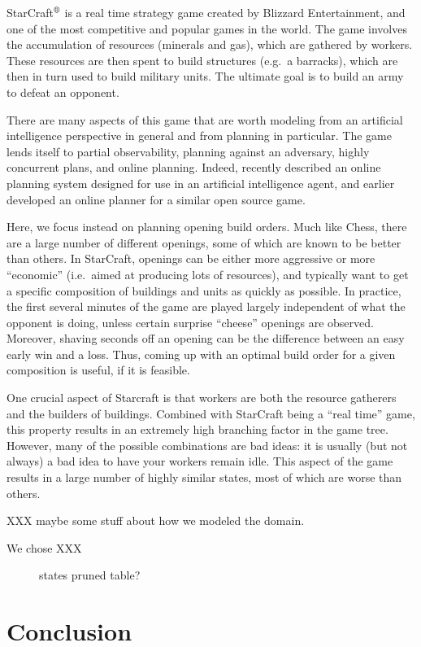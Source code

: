\documentclass[letterpaper]{article}
\theoremstyle{plain} \newtheorem{theorem}{Theorem} \newtheorem{proposition}{Proposition} \newtheorem{lemma}{Lemma}
\theoremstyle{definition} \newtheorem{definition}{Definition} \newtheorem{conjecture}{Conjecture} \newtheorem*{example}{Example}
\theoremstyle{remark} \newtheorem*{remark}{Remark} \newtheorem*{note}{Note} \newtheorem{case}{Case}
\begin{document}
StarCraft$^\textrm{\textregistered}$ is a real time strategy game
created by Blizzard Entertainment, and one of the most competitive
and popular games in the world. The game involves the accumulation
of resources (minerals and gas), which are gathered by workers.
These resources are then spent to build structures (e.g.\ a barracks),
which are then in turn used to build military units. The ultimate goal is
to build an army to defeat an opponent.


There are many aspects of this game that are worth modeling from
an artificial intelligence perspective in general and from planning
in particular. The game lends itself to partial observability,
planning against an adversary, highly concurrent plans, and online
planning.  Indeed, \citet{churchill11build} recently described an
online planning system designed for use in an artificial intelligence
agent, and \citet{chan07online} earlier developed an online planner
for a similar open source game.

Here, we focus instead on planning opening build orders. Much like
Chess, there are a large number of different openings, some of which
are known to be better than others. In StarCraft, openings can be
either more aggressive or more ``economic'' (i.e.\ aimed at producing
lots of resources), and typically want to get a specific composition
of buildings and units as quickly as possible.  In practice, the
first several minutes of the game are played largely independent
of what the opponent is doing, unless certain surprise ``cheese''
openings are observed. Moreover, shaving seconds off an opening can
be the difference between an easy early win and a loss. Thus, coming
up with an optimal build order for a given composition is useful,
if it is feasible.

One crucial aspect of Starcraft is that workers are both the resource gatherers
and the builders of buildings. Combined with StarCraft being a ``real time'' game, 
this property results in an extremely high branching factor in the game tree. However,
many of the possible combinations are bad ideas: it is usually (but not always) a bad idea
to have your workers remain idle. This aspect of the game results in a large number of highly similar
states, most of which are worse than others.

XXX maybe some stuff about how we modeled the domain.

We chose XXX

\begin{figure}
  \caption{states pruned table?}
\end{figure}

\section{Conclusion}



\end{document}
